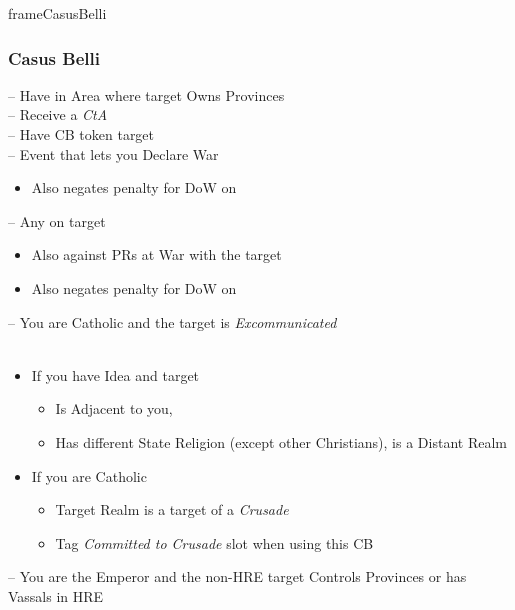 \documentclass[10pt]{article}
\begin{document}
\begin{dynamiccontents*}{frameCasusBelli}
	\begin{multicols}{2}
		\subsubsection*{Casus Belli }
		 -- Have \claim in Area where target Owns Provinces\\
		 -- Receive a \emph{CtA}\\
		 -- Have CB token target\\
		 -- Event that lets you Declare War\\
		\begin{itemize}
			\item {}Also negates penalty for DoW on \marriage
		\end{itemize}
		 -- Any \disputedsuccession on target\\
		\begin{itemize}
			\item Also against PRs at War with the target
			\item {}Also negates penalty for DoW on \marriage
		\end{itemize}
		 -- You are Catholic and the target is \emph{Excommunicated}\\
		\columnbreak
		\\
		\begin{itemize}
			\item If you have  Idea and target
			\begin{itemize}
				\item Is Adjacent to you, 
				\item Has different State Religion (except other Christians),  is a Distant Realm
			\end{itemize}
			\item If you are Catholic
			\begin{itemize}
				\item Target Realm is a target of a \emph{Crusade}
				\item Tag \emph{Committed to Crusade} slot when using this CB
			\end{itemize}
		\end{itemize}
		 -- You are the Emperor and the non-HRE target Controls Provinces or has Vassals in HRE
	\end{multicols}
\end{dynamiccontents*}
\end{document}
